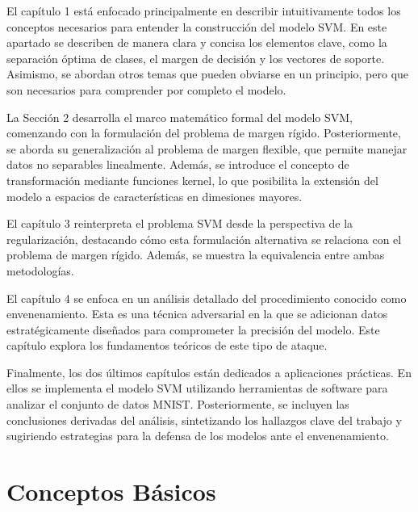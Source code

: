 \documentclass[letterpaper,12pt,oneside]{book}
\begin{document}
El capítulo 1 está enfocado principalmente en describir intuitivamente todos los conceptos necesarios para entender la construcción del modelo SVM. En este apartado se describen de manera clara y concisa los elementos clave, como la separación óptima de clases, el margen de decisión y los vectores de soporte. Asimismo, se abordan otros temas que pueden obviarse en un principio, pero que son necesarios para comprender por completo el modelo.

La Sección 2 desarrolla el marco matemático formal del modelo SVM, comenzando con la formulación del problema de margen rígido. Posteriormente, se aborda su generalización al problema de margen flexible, que permite manejar datos no separables linealmente. Además, se introduce el concepto de transformación mediante funciones kernel, lo que posibilita la extensión del modelo a espacios de características en dimesiones mayores.

El capítulo 3 reinterpreta el problema SVM desde la perspectiva de la regularización, destacando cómo esta formulación alternativa se relaciona con el problema de margen rígido. Además, se muestra la equivalencia entre ambas metodologías.

El capítulo 4 se enfoca en un análisis detallado del procedimiento conocido como envenenamiento. Esta es una técnica adversarial en la que se adicionan datos estratégicamente diseñados para comprometer la precisión del modelo. Este capítulo explora los fundamentos teóricos de este tipo de ataque.

Finalmente, los dos últimos capítulos están dedicados a aplicaciones prácticas. En ellos se implementa el modelo SVM utilizando herramientas de software para analizar el conjunto de datos MNIST. Posteriormente, se incluyen las conclusiones derivadas del análisis, sintetizando los hallazgos clave del trabajo y sugiriendo estrategias para la defensa de los modelos ante el envenenamiento.

 \newpage

\tableofcontents

    
\mainmatter

\chapter{Conceptos Básicos} 
\end{document}
